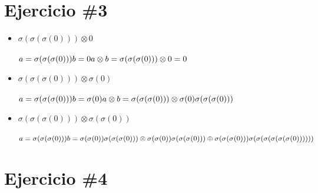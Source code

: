 \documentclass{article}
\begin{document}
\section*{Ejercicio \#3}


\begin{itemize}
        \item{$\sigma(\sigma(\sigma(0)))\otimes 0$}\\
        \\
        \begin{math}
        a=\sigma(\sigma(\sigma(0)))\\
        b=0\\
        \\
        a\otimes b = \\
        \sigma(\sigma(\sigma(0)))\otimes 0 =0\\
        \end{math}
        \item{$\sigma(\sigma(\sigma(0)))\otimes \sigma(0)$}\\
        \\
        \begin{math}
        a=\sigma(\sigma(\sigma(0)))\\
        b=\sigma(0)\\
        \\
        a\otimes b = \\
        \sigma(\sigma(\sigma(0)))\otimes \sigma(0)\\
        \sigma(\sigma(\sigma(0)))\\
        \end{math}
        \item{$\sigma(\sigma(\sigma(0)))\otimes\sigma(\sigma(0))$}\\
        \\
        \begin{math}
        a=\sigma(\sigma(\sigma(0)))\\
        b=\sigma(\sigma(0))\\
        \\
        \sigma(\sigma(\sigma(0)))\otimes \sigma(\sigma(0))\\
        \sigma(\sigma(\sigma(0)))\oplus \sigma(\sigma(\sigma(0)))\\
        \sigma(\sigma(\sigma(\sigma(\sigma(\sigma(0))))))\\
        \end{math}
\end{itemize}


\section*{Ejercicio \#4}
\end{document}
